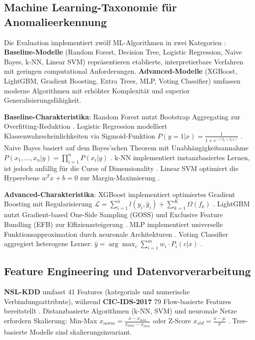 \documentclass[11pt,a4paper]{article}
\begin{document}
    \subsection{Machine Learning-Taxonomie für Anomalieerkennung}

    Die Evaluation implementiert zwölf ML-Algorithmen in zwei Kategorien \parencite{Vinayakumar2019}: \textbf{Baseline-Modelle} (Random Forest, Decision Tree, Logistic Regression, Naive Bayes, k-NN, Linear SVM) repräsentieren etablierte, interpretierbare Verfahren mit geringen computational Anforderungen. \textbf{Advanced-Modelle} (XGBoost, LightGBM, Gradient Boosting, Extra Trees, MLP, Voting Classifier) umfassen moderne Algorithmen mit erhöhter Komplexität und superior Generalisierungsfähigkeit.

    \textbf{Baseline-Charakteristika}: Random Forest nutzt Bootstrap Aggregating zur Overfitting-Reduktion \parencite{Hastie2009}. Logistic Regression modelliert Klassenwahrscheinlichkeiten via Sigmoid-Funktion $P(y=1|x) = \frac{1}{1+e^{-(\beta_0 + \beta_1 x)}}$ \parencite{Bishop2006}. Naive Bayes basiert auf dem Bayes'schen Theorem mit Unabhängigkeitsannahme $P(x_1,...,x_n|y) = \prod_{i=1}^{n} P(x_i|y)$ \parencite{Bishop2006}. k-NN implementiert instanzbasiertes Lernen, ist jedoch anfällig für die Curse of Dimensionality \parencite{Hastie2009}. Linear SVM optimiert die Hyperebene $w^T x + b = 0$ zur Margin-Maximierung \parencite{Platt1999}.

    \textbf{Advanced-Charakteristika}: XGBoost implementiert optimiertes Gradient Boosting mit Regularisierung $\mathcal{L} = \sum_{i=1}^{n} l(y_i, \hat{y}_i) + \sum_{k=1}^{K} \Omega(f_k)$ \parencite{Hastie2009}. LightGBM nutzt Gradient-based One-Side Sampling (GOSS) und Exclusive Feature Bundling (EFB) zur Effizienzsteigerung \parencite{Zhou2020}. MLP implementiert universelle Funktionsapproximation durch neuronale Architekturen \parencite{Goodfellow2016}. Voting Classifier aggregiert heterogene Lerner: $\hat{y} = \arg\max_c \sum_{i=1}^{m} w_i \cdot P_i(c|x)$ \parencite{Hastie2009}.

    \subsection{Feature Engineering und Datenvorverarbeitung}

    \textbf{NSL-KDD} umfasst 41 Features (kategoriale und numerische Verbindungsattribute), während \textbf{CIC-IDS-2017} 79 Flow-basierte Features bereitstellt \parencite{Gharib2016,Sharafaldin2018}. Distanzbasierte Algorithmen (k-NN, SVM) und neuronale Netze erfordern Skalierung: Min-Max $x_{norm} = \frac{x - x_{min}}{x_{max} - x_{min}}$ oder Z-Score $x_{std} = \frac{x - \mu}{\sigma}$ \parencite{Bishop2006}. Tree-basierte Modelle sind skalierungsinvariant.
\end{document}
